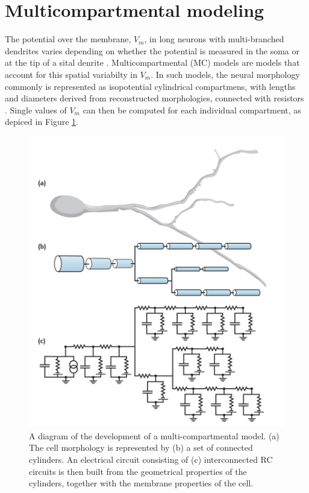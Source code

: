 \documentclass[a4paper, UKenglish, 11pt]{uiomaster}
\begin{document}
\section{Multicompartmental modeling}
The potential over the membrane, $V_m$, in long neurons with multi-branched dendrites varies depending on whether the potential is measured in the soma or at the tip of a sital denrite \cite{naess2021biophysically}. Multicompartmental (MC) models are models that account for this spatial variabilty in $V_m$. In such models, the neural morphology commonly is represented as isopotential cylindrical compartmens, with lengths and diameters derived from reconstructed morphologies, connected with resistors \cite{sterratt2011principles}. Single values of $V_m$ can then be computed for each individual compartment, as depiced in Figure \ref{fig:MC_models}.

\begin{figure}[!htb]
    \centering
    \includegraphics[width=\linewidth]{figures/MC_models.png}
    \caption{A diagram of the development of a multi-compartmental model.
(a) The cell morphology is represented by (b) a set of connected cylinders. An electrical circuit consisting of (c) interconnected RC circuits is then built from the geometrical properties of the cylinders, together with the membrane properties of the cell.}
    \label{fig:MC_models}
\end{figure}
\end{document}
